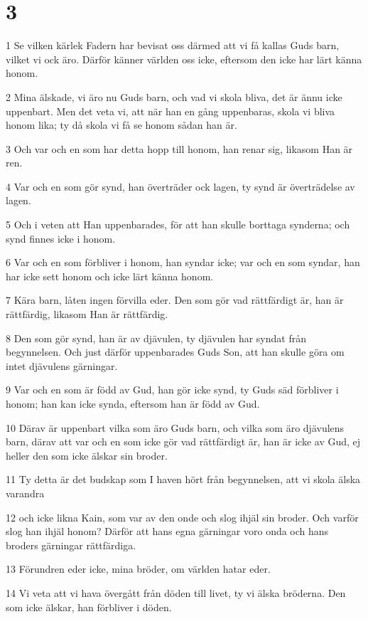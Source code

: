 \chapter{3}

\par 1 Se vilken kärlek Fadern har bevisat oss därmed att vi få kallas Guds barn, vilket vi ock äro. Därför känner världen oss icke, eftersom den icke har lärt känna honom.
\par 2 Mina älskade, vi äro nu Guds barn, och vad vi skola bliva, det är ännu icke uppenbart. Men det veta vi, att när han en gång uppenbaras, skola vi bliva honom lika; ty då skola vi få se honom sådan han är.
\par 3 Och var och en som har detta hopp till honom, han renar sig, likasom Han är ren.
\par 4 Var och en som gör synd, han överträder ock lagen, ty synd är överträdelse av lagen.
\par 5 Och i veten att Han uppenbarades, för att han skulle borttaga synderna; och synd finnes icke i honom.
\par 6 Var och en som förbliver i honom, han syndar icke; var och en som syndar, han har icke sett honom och icke lärt känna honom.
\par 7 Kära barn, låten ingen förvilla eder. Den som gör vad rättfärdigt är, han är rättfärdig, likasom Han är rättfärdig.
\par 8 Den som gör synd, han är av djävulen, ty djävulen har syndat från begynnelsen. Och just därför uppenbarades Guds Son, att han skulle göra om intet djävulens gärningar.
\par 9 Var och en som är född av Gud, han gör icke synd, ty Guds säd förbliver i honom; han kan icke synda, eftersom han är född av Gud.
\par 10 Därav är uppenbart vilka som äro Guds barn, och vilka som äro djävulens barn, därav att var och en som icke gör vad rättfärdigt är, han är icke av Gud, ej heller den som icke älskar sin broder.
\par 11 Ty detta är det budskap som I haven hört från begynnelsen, att vi skola älska varandra
\par 12 och icke likna Kain, som var av den onde och slog ihjäl sin broder. Och varför slog han ihjäl honom? Därför att hans egna gärningar voro onda och hans broders gärningar rättfärdiga.
\par 13 Förundren eder icke, mina bröder, om världen hatar eder.
\par 14 Vi veta att vi hava övergått från döden till livet, ty vi älska bröderna. Den som icke älskar, han förbliver i döden.
